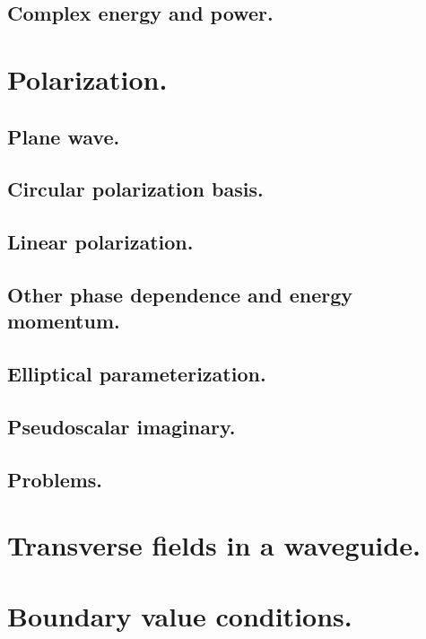          \subsection{Complex energy and power.}
            
      \section{Polarization.}
         \subsection{Plane wave.}
            
         \subsection{Circular polarization basis.}
            
         \subsection{Linear polarization.}
            
         \subsection{Other phase dependence and energy momentum.}
            
         \subsection{Elliptical parameterization.}
            
         \subsection{Pseudoscalar imaginary.}
            
         \subsection{Problems.}
            
      \section{Transverse fields in a waveguide.}
         
      \section{Boundary value conditions.}
         
